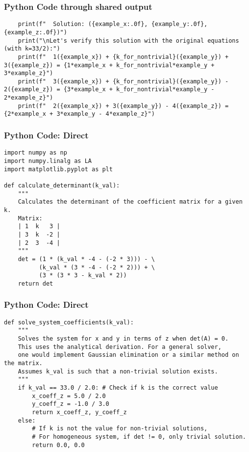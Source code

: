 \documentclass{beamer}
\begin{document}
\begin{frame}[fragile]
\frametitle{Python Code through shared output}
\begin{lstlisting}
    print(f"  Solution: ({example_x:.0f}, {example_y:.0f}, {example_z:.0f})")
    print("\nLet's verify this solution with the original equations (with k=33/2):")
    print(f"  1({example_x}) + {k_for_nontrivial}({example_y}) + 3({example_z}) = {1*example_x + k_for_nontrivial*example_y + 3*example_z}")
    print(f"  3({example_x}) + {k_for_nontrivial}({example_y}) - 2({example_z}) = {3*example_x + k_for_nontrivial*example_y - 2*example_z}")
    print(f"  2({example_x}) + 3({example_y}) - 4({example_z}) = {2*example_x + 3*example_y - 4*example_z}")
\end{lstlisting}
 \end{frame}

\begin{frame}[fragile]
\frametitle{Python Code: Direct}
\begin{lstlisting}
import numpy as np
import numpy.linalg as LA
import matplotlib.pyplot as plt

def calculate_determinant(k_val):
    """
    Calculates the determinant of the coefficient matrix for a given k.
    Matrix:
    | 1  k   3 |
    | 3  k  -2 |
    | 2  3  -4 |
    """
    det = (1 * (k_val * -4 - (-2 * 3))) - \
          (k_val * (3 * -4 - (-2 * 2))) + \
          (3 * (3 * 3 - k_val * 2))
    return det
\end{lstlisting}
 \end{frame}

\begin{frame}[fragile]
\frametitle{Python Code: Direct}
\begin{lstlisting}
def solve_system_coefficients(k_val):
    """
    Solves the system for x and y in terms of z when det(A) = 0.
    This uses the analytical derivation. For a general solver,
    one would implement Gaussian elimination or a similar method on the matrix.
    Assumes k_val is such that a non-trivial solution exists.
    """
    if k_val == 33.0 / 2.0: # Check if k is the correct value
        x_coeff_z = 5.0 / 2.0
        y_coeff_z = -1.0 / 3.0
        return x_coeff_z, y_coeff_z
    else:
        # If k is not the value for non-trivial solutions,
        # For homogeneous system, if det != 0, only trivial solution.
        return 0.0, 0.0
\end{lstlisting}
 \end{frame}
\end{document}
